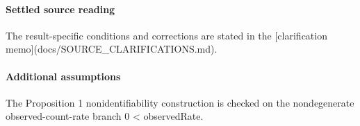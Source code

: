 \documentclass[10pt]{article}
\begin{document}
\paragraph{Settled source reading}
\begin{sloppypar}
The result-\allowbreak{}specific conditions and corrections are stated in the [clarification memo](docs/\allowbreak{}SOURCE\_\allowbreak{}CLARIFICATIONS.\allowbreak{}md).\allowbreak{}
\end{sloppypar}
\paragraph{Additional assumptions}
\begin{sloppypar}
The Proposition 1 nonidentifiability construction is checked on the nondegenerate observed-count-rate branch 0 < observedRate.
\end{sloppypar}
\end{document}
